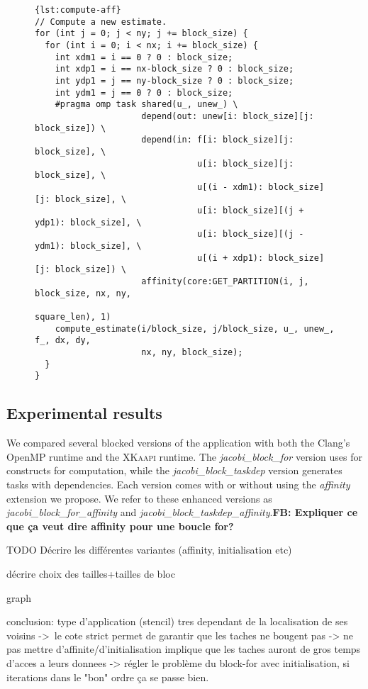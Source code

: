 \documentclass{Styles/llncs}
\newcommand{\kaapi}{\textsc{\mbox{XKaapi}}\xspace}
\newcommand{\FB}[1]{{\color{orange}\bfseries FB: #1}}
\begin{document}
\begin{figure}[htbp]
\begin{lstlisting}[caption=Example of use of the affinity clause for computation,frame=tlrb,style=smaller,label=lst:compute-aff]{lst:compute-aff}
// Compute a new estimate.
for (int j = 0; j < ny; j += block_size) {
  for (int i = 0; i < nx; i += block_size) {
    int xdm1 = i == 0 ? 0 : block_size;
    int xdp1 = i == nx-block_size ? 0 : block_size;
    int ydp1 = j == ny-block_size ? 0 : block_size;
    int ydm1 = j == 0 ? 0 : block_size;
    #pragma omp task shared(u_, unew_) \
                     depend(out: unew[i: block_size][j: block_size]) \
                     depend(in: f[i: block_size][j: block_size], \
                                u[i: block_size][j: block_size], \
                                u[(i - xdm1): block_size][j: block_size], \
                                u[i: block_size][(j + ydp1): block_size], \
                                u[i: block_size][(j - ydm1): block_size], \
                                u[(i + xdp1): block_size][j: block_size]) \
                     affinity(core:GET_PARTITION(i, j, block_size, nx, ny,
                                                 square_len), 1)
    compute_estimate(i/block_size, j/block_size, u_, unew_, f_, dx, dy,
                     nx, ny, block_size);
  }
}
\end{lstlisting}
\end{figure}

\subsection{Experimental results}

We compared several blocked versions of the application with both the Clang's OpenMP runtime
and the \kaapi runtime. The \textit{jacobi\_block\_for} version uses for constructs for computation, while the \textit{jacobi\_block\_taskdep} version generates tasks with dependencies. Each version comes with or without using the \emph{affinity} extension we propose. We refer to these enhanced versions as \textit{jacobi\_block\_for\_affinity} and \textit{jacobi\_block\_taskdep\_affinity}.\FB{Expliquer ce que ça veut dire affinity pour une boucle for?}

TODO Décrire les différentes variantes
(affinity, initialisation etc)

décrire choix des tailles+tailles de bloc

graph

conclusion: type d'application (stencil) tres dependant de la localisation de ses voisins
-> le cote strict permet de garantir que les taches ne bougent pas
-> ne pas mettre d'affinite/d'initialisation implique que les taches auront de gros temps d'acces a leurs donnees
-> régler le problème du block-for avec initialisation, si iterations dans le "bon" ordre ça se passe bien.
\end{document}
